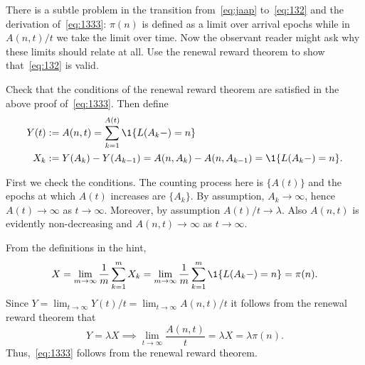 \begin{exercise}
 There is a subtle problem in the transition from~\cref{eq:jaap} to~\cref{eq:132} and the derivation of~\cref{eq:1333}: $\pi(n)$ is defined as a limit over arrival epochs while in $A(n,t)/t$ we take the limit over time.
 Now the observant reader might ask why these limits should relate at all.
 Use the renewal reward theorem to show that~\cref{eq:132} is valid.
\begin{hint}
Check that the conditions of the renewal reward theorem are satisfied in the above proof of~\cref{eq:1333}. Then define 
\begin{align*}
 Y(t) &:= A(n,t) = \sum_{k=1}^{A(t)} \1{L(A_k-) = n} \\
X_k &:= Y(A_k) - Y(A_{k-1}) = A(n, A_k) - A(n, A_{k-1}) = \1{L(A_k-)=n}.
\end{align*}

\end{hint}
\begin{solution}
First we check the conditions. The counting process here is $\{A(t)\}$ and the epochs at which
 $A(t)$ increases are $\{A_k\}$. By assumption, $A_k\to\infty$,
 hence $A(t)\to\infty$ as $t\to\infty$. Moreover, by assumption
 $A(t)/t \to \lambda$. Also $A(n,t)$ is evidently non-decreasing and
 $A(n,t)\to\infty$ as $t\to\infty$.


From the definitions in the hint, 
\begin{equation*}
X= \lim_{m\to\infty} \frac 1 m \sum_{k=1}^m X_k =\lim_{m\to\infty} \frac 1 m \sum_{k=1}^m \1{L(A_k-)=n} = \pi(n).
\end{equation*}
Since $Y=\lim_{t\to\infty} Y(t)/t = \lim_{t\to\infty} A(n,t)/t$ it follows from the renewal reward theorem that
\begin{equation*}
 Y=\lambda X \implies \lim_{t\to\infty} \frac{A(n,t)} t = \lambda X = \lambda \pi(n).
\end{equation*}
Thus,~\cref{eq:1333} follows from the renewal reward theorem.
\end{solution}
\end{exercise}





